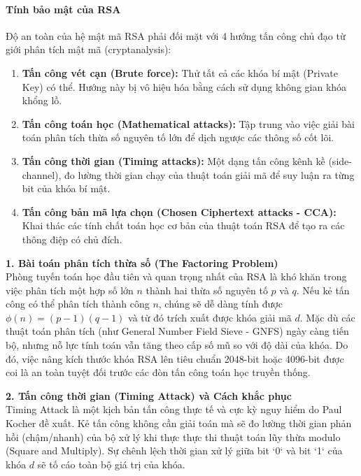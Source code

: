 \paragraph*{Tính bảo mật của RSA}

Độ an toàn của hệ mật mã RSA phải đối mặt với 4 hướng tấn công chủ đạo từ giới phân tích mật mã (cryptanalysis):
\begin{enumerate}
    \item \textbf{Tấn công vét cạn (Brute force):} Thử tất cả các khóa bí mật (Private Key) có thể. Hướng này bị vô hiệu hóa bằng cách sử dụng không gian khóa khổng lồ.
    \item \textbf{Tấn công toán học (Mathematical attacks):} Tập trung vào việc giải bài toán phân tích thừa số nguyên tố lớn để dịch ngược các thông số cốt lõi.
    \item \textbf{Tấn công thời gian (Timing attacks):} Một dạng tấn công kênh kề (side-channel), đo lường thời gian chạy của thuật toán giải mã để suy luận ra từng bit của khóa bí mật.
    \item \textbf{Tấn công bản mã lựa chọn (Chosen Ciphertext attacks - CCA):} Khai thác các tính chất toán học cơ bản của thuật toán RSA để tạo ra các thông điệp có chủ đích.
\end{enumerate}

\textbf{1. Bài toán phân tích thừa số (The Factoring Problem)} \\
Phòng tuyến toán học đầu tiên và quan trọng nhất của RSA là khó khăn trong việc phân tích một hợp số lớn $n$ thành hai thừa số nguyên tố $p$ và $q$. Nếu kẻ tấn công có thể phân tích thành công $n$, chúng sẽ dễ dàng tính được $\phi(n) = (p-1)(q-1)$ và từ đó trích xuất được khóa giải mã $d$. Mặc dù các thuật toán phân tích (như General Number Field Sieve - GNFS) ngày càng tiến bộ, nhưng nỗ lực tính toán vẫn tăng theo cấp số mũ so với độ dài của khóa. Do đó, việc nâng kích thước khóa RSA lên tiêu chuẩn 2048-bit hoặc 4096-bit được coi là an toàn tuyệt đối trước các đòn tấn công toán học truyền thống.

\textbf{2. Tấn công thời gian (Timing Attack) và Cách khắc phục} \\
Timing Attack là một kịch bản tấn công thực tế và cực kỳ nguy hiểm do Paul Kocher đề xuất. Kẻ tấn công không cần giải toán mà sẽ đo lường thời gian phản hồi (chậm/nhanh) của bộ xử lý khi thực thực thi thuật toán lũy thừa modulo (Square and Multiply). Sự chênh lệch thời gian xử lý giữa bit `0` và bit `1` của khóa $d$ sẽ tố cáo toàn bộ giá trị của khóa.

